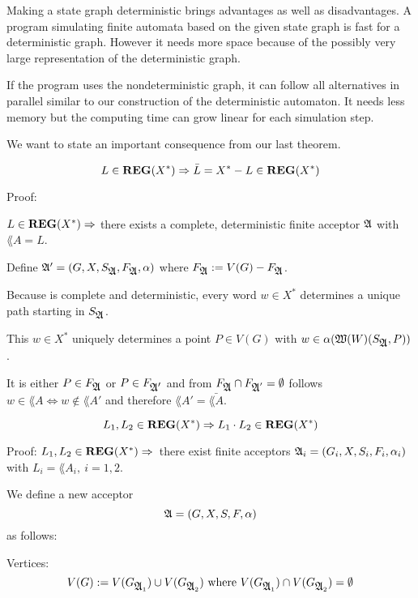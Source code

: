 Making a state graph deterministic brings advantages as well as disadvantages. A
program simulating finite automata based on the given state graph is fast for
a deterministic graph. However it needs more space because of the possibly very
large representation of the deterministic graph.

If the program uses the nondeterministic graph, it can follow all alternatives
in parallel similar to our construction of the deterministic automaton. It needs
less memory but the computing time can grow linear for each simulation step.

We want to state an important consequence from our last theorem.

\begin{theorem}
\[ L \in \mbox{{\bf REG}}(X^*) \Rightarrow \bar{L} = X^* - L \in \mbox{{\bf REG}}(X^*) \]
\end{theorem}

Proof: 

$L \in \mbox{{\bf REG}}(X^*) \Rightarrow $ there exists a complete, deterministic
finite acceptor $\mbox{$\mathfrak{A}$}$ with $\lang{A} = L$.

Define $\mbox{$\mathfrak{A'}$} = (G, X, S_{\mbox{$\mathfrak{A}$}}, F_{\mbox{$\mathfrak{A}$}}, \alpha)$ where $F_{\mbox{$\mathfrak{A}$}} :=
V(G) - F_{\mbox{$\mathfrak{A}$}}$.

Because  is complete and deterministic, every word $w \in X^*$ determines
a unique path starting in $S_{\mbox{$\mathfrak{A}$}}$.

This $w \in X^*$ uniquely determines a point $P \in V(G)$ with $w \in
\alpha(\mbox{$\mathfrak{W}(W)$}(S_{\mbox{$\mathfrak{A}$}}, P))$.

It is either $P \in F_{\mbox{$\mathfrak{A}$}}$ or $P \in F_{\mbox{$\mathfrak{A'}$}}$ and from $F_{\mbox{$\mathfrak{A}$}}
\cap F_{\mbox{$\mathfrak{A}$}'} = \emptyset$ follows $w \in \lang{A} \Leftrightarrow w
\notin \lang{A'}$ and therefore $\lang{A'} = \bar{\lang{A}}$.

\begin{theorem}
\[ L_1, L_2 \in \mbox{{\bf REG}}(X^*) \Rightarrow L_1 \cdot L_2 \in \mbox{{\bf REG}}(X^*) \]
\end{theorem}

Proof: $L_1, L_2 \in \mbox{{\bf REG}}(X^*) \Rightarrow$\ there exist finite acceptors
$\mbox{$\mathfrak{A}$}_i = (G_i, X, S_i, F_i, \alpha_i)$ with $L_i = \lang{A}_i,\ i = 1,2$.

We define a new acceptor
\[\mbox{$\mathfrak{A}$} = (G, X, S, F, \alpha) \]
as follows:

Vertices:
\[ V(G) := V(G_{\mbox{$\mathfrak{A}$}_1}) \cup V(G_{\mbox{$\mathfrak{A}$}_2})\mbox{ where }V(G_{\mbox{$\mathfrak{A}$}_1})
\cap V(G_{\mbox{$\mathfrak{A}$}_2}) = \emptyset \]

